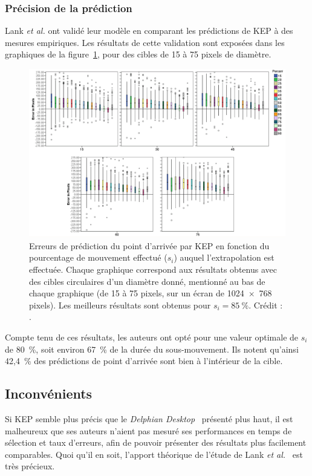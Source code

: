 	\subsubsection{Précision de la prédiction}
	Lank \emph{et al.} ont validé leur modèle en comparant les prédictions de KEP à des mesures empiriques. Les résultats de cette validation sont exposées dans les graphiques de la figure~\ref{fig:kepErrors}, pour des cibles de 15 à 75 pixels de diamètre.
	
	\begin{figure}[!htb]
		\centering
		\includegraphics[width=\textwidth]{figures/ch2/kepErrors}
		\caption[KEP -- erreurs de prédiction]{Erreurs de prédiction du point d'arrivée par KEP en fonction du pourcentage de mouvement effectué ($s_{i}$) auquel l'extrapolation est effectuée. Chaque graphique correspond aux résultats obtenus avec des cibles circulaires d'un diamètre donné, mentionné au bas de chaque graphique (de 15 à 75 pixels, sur un écran de 1024~$\times$~768 pixels). Les meilleurs résultats sont obtenus pour $s_{i} = 85~\%{}$. Crédit : \cite{lank2007endpoint}.}
		\label{fig:kepErrors}
	\end{figure}
	
	Compte tenu de ces résultats, les auteurs ont opté pour une valeur optimale de $s_{i}$ de 80~\%{}, soit environ 67~\%{} de la durée du sous-mouvement. Ils notent qu'ainsi 42,4~\%{} des prédictions de point d'arrivée sont bien à l'intérieur de la cible.	
	
	\subsection{Inconvénients}
	Si KEP semble plus précis que le \emph{Delphian Desktop}~\cite{asano2005predictive} présenté plus haut, il est malheureux que ses auteurs n'aient pas mesuré ses performances en temps de sélection et taux d'erreurs, afin de pouvoir présenter des résultats plus facilement comparables. Quoi qu'il en soit, l'apport théorique de l'étude de Lank \emph{et al.}~\cite{lank2007endpoint} est très précieux.
	
